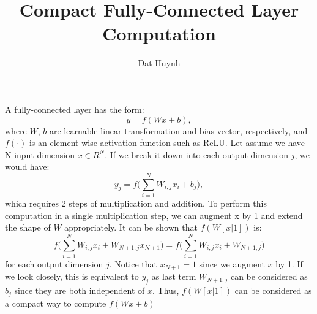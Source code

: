 \documentclass[11pt]{article} %
\title{Compact Fully-Connected Layer Computation}
\author{Dat Huynh}
\begin{document}
\maketitle

A fully-connected layer has the form: 
\begin{equation}
y = f(Wx+b), 
\end{equation}
where $W$, $b$ are learnable linear transformation and bias vector, respectively, and $f(\cdot)$ is an element-wise activation function such as ReLU. 
Let assume we have N input dimension $x\in R^N$. If we break it down into each output dimension $j$, we would have:
\begin{equation}
y_j = f\Big(\sum^{N}_{i=1}W_{i,j} x_i + b_j\Big),
\end{equation}
which requires 2 steps of multiplication and addition.
To perform this computation in a single multiplication step, we can augment x by 1 and extend the shape of $W$ appropriately. 
It can be shown that $f(W[x|1])$ is:
\begin{equation} 
f\Big(\sum^{N}_{i=1}W_{i,j} x_i + W_{N+1,j}x_{N+1}\Big) = f\Big(\sum^{N}_{i=1}W_{i,j} x_i + W_{N+1,j}\Big)
\end{equation}
for each output dimension $j$. Notice that $x_{N+1}=1$ since we augment $x$ by 1.
If we look closely, this is equivalent to $y_j$ as last term $W_{N+1,j}$ can be considered as $b_j$ since they are both independent of $x$. Thus, $f(W[x|1])$ can be considered as a compact way to compute $f(Wx+b)$
\end{document}
